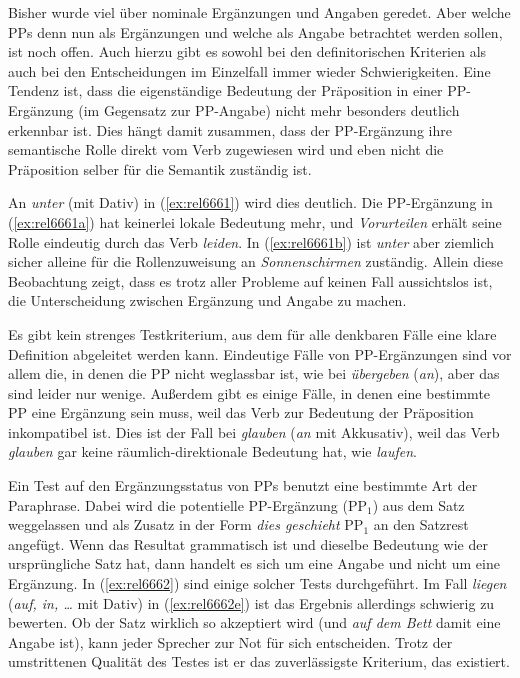 Bisher wurde viel über nominale Ergänzungen und Angaben geredet.
Aber welche PPs denn nun als Ergänzungen und welche als Angabe betrachtet werden sollen, ist noch offen.
Auch hierzu gibt es sowohl bei den definitorischen Kriterien als auch bei den Entscheidungen im Einzelfall immer wieder Schwierigkeiten.
Eine Tendenz ist, dass die eigenständige Bedeutung der Präposition in einer PP-Ergänzung (im Gegensatz zur PP-Angabe) nicht mehr besonders deutlich erkennbar ist.
Dies hängt damit zusammen, dass der PP-Ergänzung ihre semantische Rolle direkt vom Verb zugewiesen wird und eben nicht die Präposition selber für die Semantik zuständig ist.

An \textit{unter} (mit Dativ) in (\ref{ex:rel6661}) wird dies deutlich.
Die PP-Ergänzung in (\ref{ex:rel6661a}) hat keinerlei lokale Bedeutung mehr, und \textit{Vorurteilen} erhält seine Rolle eindeutig durch das Verb \textit{leiden}.
In (\ref{ex:rel6661b}) ist \textit{unter} aber ziemlich sicher alleine für die Rollenzuweisung an \textit{Sonnenschirmen} zuständig.
Allein diese Beobachtung zeigt, dass es trotz aller Probleme auf keinen Fall aussichtslos ist, die Unterscheidung zwischen Ergänzung und Angabe zu machen.

\begin{exe}
  \ex\label{ex:rel6661} 
  \begin{xlist}
  \end{xlist}
\end{exe}

Es gibt kein strenges Testkriterium, aus dem für alle denkbaren Fälle eine klare Definition abgeleitet werden kann.
Eindeutige Fälle von PP-Ergänzungen sind vor allem die, in denen die PP nicht weglassbar ist, wie bei \textit{übergeben} (\textit{an}), aber das sind leider nur wenige.
Außerdem gibt es einige Fälle, in denen eine bestimmte PP eine Ergänzung sein muss, weil das Verb zur Bedeutung der Präposition inkompatibel ist.
Dies ist \zB der Fall bei \textit{glauben} (\textit{an} mit Akkusativ), weil das Verb \textit{glauben} gar keine räumlich-direktionale Bedeutung hat, wie \zB \textit{laufen}.

Ein Test auf den Ergänzungsstatus von PPs benutzt eine bestimmte Art der Paraphrase.
Dabei wird die potentielle PP-Ergänzung (PP$_1$) aus dem Satz weggelassen und als Zusatz in der Form \textit{dies geschieht} PP$_1$ an den Satzrest angefügt.
Wenn das Resultat grammatisch ist und dieselbe Bedeutung wie der ursprüngliche Satz hat, dann handelt es sich um eine Angabe und nicht um eine Ergänzung.
In (\ref{ex:rel6662}) sind einige solcher Tests durchgeführt.
Im Fall \textit{liegen} (\textit{auf, in, \ldots} mit Dativ) in (\ref{ex:rel6662e}) ist das Ergebnis allerdings schwierig zu bewerten.
Ob der Satz wirklich so akzeptiert wird (und \textit{auf dem Bett} damit eine Angabe ist), kann jeder Sprecher zur Not für sich entscheiden.
Trotz der umstrittenen Qualität des Testes ist er das zuverlässigste Kriterium, das existiert.

